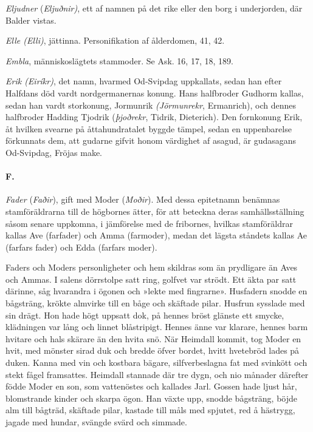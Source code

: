 \emph{Eljudner} (\emph{Eljuðnir)}, ett af namnen på det rike eller den
borg i underjorden, där Balder vistas.

\emph{Elle (Elli)}, jättinna. Personifikation af ålderdomen, 41, 42.

\emph{Embla}, människoslägtets stammoder. Se Ask. 16, 17, 18, 189.

\emph{Erik (Eiríkr)}, det namn, hvarmed Od-Svipdag uppkallats, sedan han
efter Halfdans död vardt nordgermanernas konung. Hans halfbroder Gudhorm
kallas, sedan han vardt storkonung, Jormunrik \emph{(Jörmunrekr},
Ermanrich), och dennes halfbroder Hadding Tjodrik (\emph{þjoðrekr},
Tidrik, Dieterich). Den fornkonung Erik, åt hvilken svearne på
åttahundratalet byggde tämpel, sedan en uppenbarelse förkunnats dem, att
gudarne gifvit honom värdighet af asagud, är gudasagans Od-Svipdag,
Fröjas make.

\paragraph{F.}

\emph{Fader} (\emph{Faðir}), gift med Moder (\emph{Moðir}). Med dessa
epitetnamn benämnas stamföräldrarna till de högbornes ätter, för att
beteckna deras samhällsställning såsom senare uppkomna, i jämförelse med
de fribornes, hvilkas stamföräldrar kallas Ave (farfader) och Amma
(farmoder), medan det lägsta ståndets kallas Ae (farfars fader) och Edda
(farfars moder).

\protect\hypertarget{lb1625905.xhtmlux5cux23start213}{}{}\protect\hypertarget{lb1625905.xhtmlux5cux23start213-a}{}{}\protect\hypertarget{lb1625905.xhtmlux5cux23start213-b}{}{}\protect\hypertarget{lb1625905.xhtmlux5cux23start213-c}{}{}\protect\hypertarget{lb1625905.xhtmlux5cux23start213-d}{}{}

Faders och Moders personligheter och hem skildras som än prydligare än
Aves och Ammas. I salens dörrstolpe satt ring, golfvet var strödt. Ett
äkta par satt därinne, såg hvarandra i ögonen och »lekte med fingrarne».
Husfadern snodde en bågsträng, krökte almvirke till en båge och skäftade
pilar. Husfrun sysslade med sin drägt. Hon hade högt uppsatt dok, på
hennes bröst glänste ett smycke, klädningen var lång och linnet
blåstripigt. Hennes änne var klarare, hennes barm hvitare och hals
skärare än den hvita snö. När Heimdall kommit, tog Moder en hvit, med
mönster sirad duk och bredde öfver bordet, hvitt hvetebröd lades på
duken. Kanna med vin och kostbara bägare, silfverbeslagna fat med
svinkött och stekt fågel framsattes. Heimdall stannade där tre dygn, och
nio månader därefter födde Moder en son, som vattenöstes och kallades
Jarl. Gossen hade ljust hår, blomstrande kinder och skarpa ögon. Han
växte upp, snodde bågsträng, böjde alm till bågträd, skäftade pilar,
kastade till måls med spjutet, red å hästrygg, jagade med hundar,
svängde svärd och simmade.

